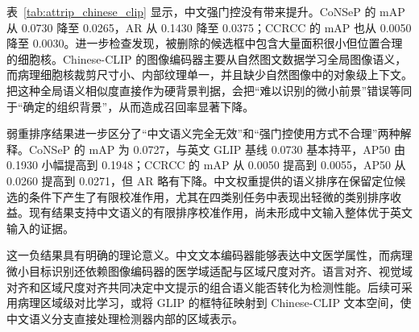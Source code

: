 \begin{table}[htbp]
\centering
\caption{中文语义重排序结果}
\label{tab:attrip_chinese_clip}
\end{table}

表~\ref{tab:attrip_chinese_clip} 显示，中文强门控没有带来提升。CoNSeP 的 mAP 从 0.0730 降至 0.0265，AR 从 0.1430 降至 0.0375；CCRCC 的 mAP 也从 0.0050 降至 0.0030。进一步检查发现，被删除的候选框中包含大量面积很小但位置合理的细胞核。Chinese-CLIP 的图像编码器主要从自然图文数据学习全局图像语义，而病理细胞核裁剪尺寸小、内部纹理单一，并且缺少自然图像中的对象级上下文。把这种全局语义相似度直接作为硬背景判据，会把“难以识别的微小前景”错误等同于“确定的组织背景”，从而造成召回率显著下降。

弱重排序结果进一步区分了“中文语义完全无效”和“强门控使用方式不合理”两种解释。CoNSeP 的 mAP 为 0.0727，与英文 GLIP 基线 0.0730 基本持平，AP50 由 0.1930 小幅提高到 0.1948；CCRCC 的 mAP 从 0.0050 提高到 0.0055，AP50 从 0.0260 提高到 0.0271，但 AR 略有下降。中文权重提供的语义排序在保留定位候选的条件下产生了有限校准作用，尤其在四类别任务中表现出轻微的类别排序收益。现有结果支持中文语义的有限排序校准作用，尚未形成中文输入整体优于英文输入的证据。

这一负结果具有明确的理论意义。中文文本编码器能够表达中文医学属性，而病理微小目标识别还依赖图像编码器的医学域适配与区域尺度对齐。语言对齐、视觉域对齐和区域尺度对齐共同决定中文提示的组合语义能否转化为检测性能。后续可采用病理区域级对比学习，或将 GLIP 的框特征映射到 Chinese-CLIP 文本空间，使中文语义分支直接处理检测器内部的区域表示。

